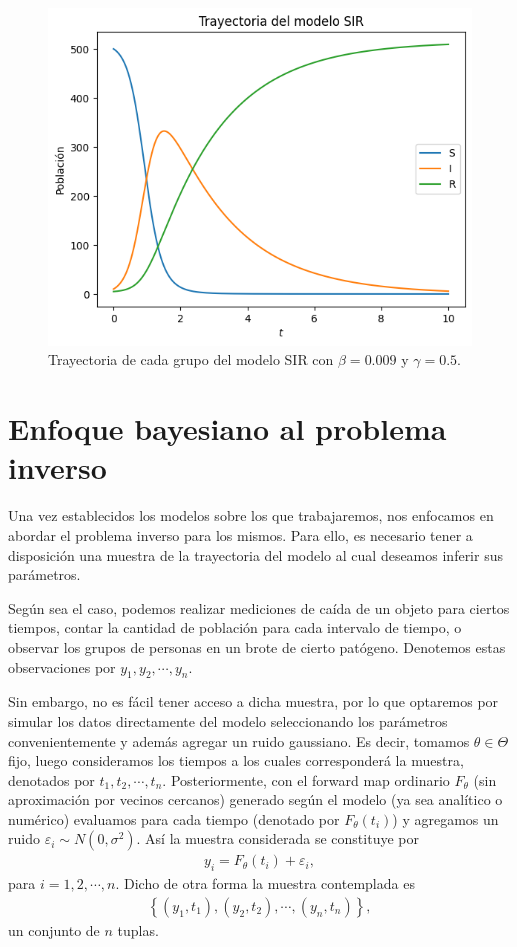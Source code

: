 \begin{figure}
    \centering
    \includegraphics[width = 10 cm]{img/trayectoria_SIR.png}
    \caption{Trayectoria de cada grupo del modelo SIR con $\beta = 0.009$ y $\gamma = 0.5$.}
    \label{fig:trayectoria_SIR}
\end{figure}

\section{Enfoque bayesiano al problema inverso}

Una vez establecidos los modelos sobre los que trabajaremos, nos enfocamos en abordar el problema inverso para los mismos. Para ello, es necesario tener a disposición una muestra de la trayectoria del modelo al cual deseamos inferir sus parámetros.

Según sea el caso, podemos realizar mediciones de caída de un objeto para ciertos tiempos, contar la cantidad de población para cada intervalo de tiempo, o observar los grupos de personas en un brote de cierto patógeno. Denotemos estas observaciones por $y_1, y_2, \cdots, y_n$. 

Sin embargo, no es fácil tener acceso a dicha muestra, por lo que optaremos por simular los datos directamente del modelo seleccionando los parámetros convenientemente y además agregar un ruido gaussiano. Es decir, tomamos $\theta \in \Theta$ fijo, luego consideramos los tiempos a los cuales corresponderá la muestra, denotados por $t_1, t_2, \cdots, t_n$. Posteriormente, con el forward map ordinario $F_{\theta}$ (sin aproximación por vecinos cercanos) generado según el modelo (ya sea analítico o numérico) evaluamos para cada tiempo (denotado por $F_{\theta}(t_i)$) y agregamos un ruido $\varepsilon_i \sim N(0,\sigma^2)$. Así la muestra considerada se constituye por
\begin{align}
    y_i = F_{\theta}(t_i) + \varepsilon_i,
    \label{3.2.01}
\end{align}
para $i = 1,2, \cdots, n$. Dicho de otra forma la muestra contemplada es
\begin{align}
    \left \{ (y_1,t_1), (y_2, t_2), \cdots, (y_n, t_n)\right \},
\end{align}
un conjunto de $n$ tuplas.


